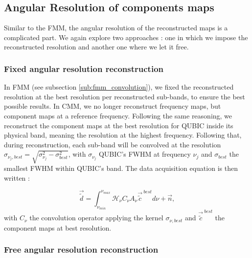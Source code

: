 \documentclass[../../thesis.tex]{subfiles}
\begin{document}
\subsection{Angular Resolution of components maps}

Similar to the FMM, the angular resolution of the reconstructed maps is a complicated part. We again explore two approaches : one in which we impose the reconstructed resolution and another one where we let it free.

\subsubsection{Fixed angular resolution reconstruction}

In FMM (see subsection \ref{sub:fmm_convolution}), we fixed the reconstructed resolution at the best resolution per reconstructed sub-bands, to ensure the best possible results. In CMM, we no longer reconstruct frequency maps, but component maps at a reference frequency. Following the same reasoning, we reconstruct the component maps at the best resolution for QUBIC inside its physical band, meaning the resolution at the highest frequency. Following that, during reconstruction, each sub-band will be convolved at the resolution $\sigma_{\nu_j, best} = \sqrt{\sigma_{\nu_j}^2 - \sigma_{best}^2}$, with $\sigma_{\nu_j}$ QUBIC's FWHM at frequency $\nu_j$ and $\sigma_{best}$ the smallest FWHM within QUBIC's band. The data acquisition equation is then written :

\begin{equation}
    \vec{\tilde{d}} = \int_{\nu_{min}}^{\nu_{max}} \mathcal{H}_\nu C_\nu A_{\nu} \vec{\tilde{c}}^{~best} d\nu + \vec{n},
\end{equation}
with $C_\nu$ the convolution operator applying the kernel $\sigma_{\nu,best}$ and $\vec{\tilde{c}}^{~best}$ the component maps at best resolution.

\subsubsection{Free angular resolution reconstruction} \label{sub:cmm_free_convo}
\end{document}
